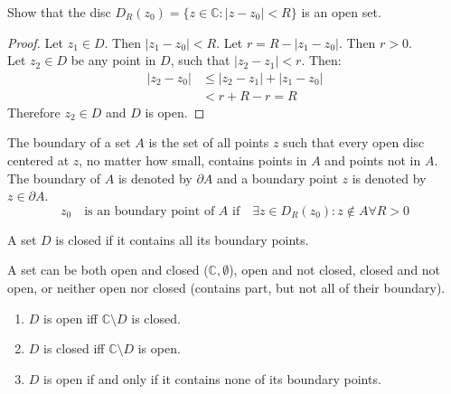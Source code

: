 \begin{example}
    Show that the disc $D_R(z_0) = \{z \in \mathbb{C} : |z - z_0| < R\}$ is an open set.
    \begin{proof}
        Let $z_1 \in D$. Then $|z_1 - z_0| < R$. Let $r = R - |z_1 - z_0|$. Then $r > 0$. \\
        Let $z_2 \in D$ be any point in $D$, such that $|z_2 - z_1| < r$. Then:
        \begin{align*}
            |z_2 - z_0| & \leq |z_2 - z_1| + |z_1 - z_0| \\
                        & < r + R - r = R
        \end{align*}
        Therefore $z_2 \in D$ and $D$ is open.
    \end{proof}
\end{example}

\begin{definition}
    The boundary of a set $A$ is the set of all points $z$ such that every open disc centered at $z$, no matter how small, contains points in $A$ and points not in $A$. \\
    The boundary of $A$ is denoted by $\partial A$ and a boundary point $z$ is denoted by $z \in \partial A$.
    \[z_0 \quad \text{is an boundary point of $A$ if} \quad \exists z \in D_{R}(z_0) :z \notin A \forall R> 0\]
\end{definition}

\begin{definition}
    A set $D$ is closed if it contains all its boundary points.
\end{definition}
\begin{remark}
    A set can be both open and closed ($\mathbb{C}, \emptyset$), open and not closed, closed and not open, or neither open nor closed (contains part, but not all of their boundary).
\end{remark}
\begin{theorem}
    \begin{enumerate}
        \item $D$ is open iff $\mathbb{C} \setminus D$ is closed.
        \item $D$ is closed iff $\mathbb{C} \setminus D$ is open.
        \item $D$ is open if and only if it contains none of its boundary points.
    \end{enumerate}
\end{theorem}

